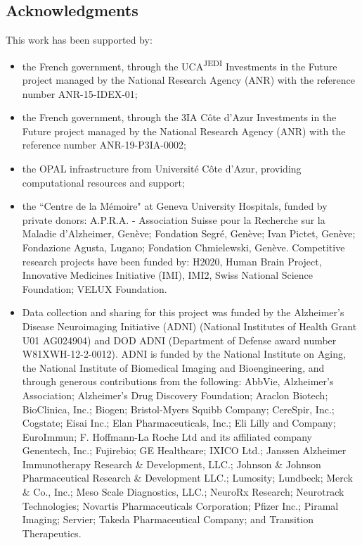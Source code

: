 \subsection*{Acknowledgments}
\label{sec:ack}

This work has been supported by:
\begin{itemize}
%
\item the French government, through the UCA\textsuperscript{JEDI} Investments in the Future project managed by the National Research Agency (ANR) with the reference number ANR-15-IDEX-01;
%
\item the French government, through the 3IA Côte d'Azur Investments in the Future project managed by the National Research Agency (ANR) with the reference number ANR-19-P3IA-0002;
%
\item the OPAL infrastructure from Université Côte d'Azur, providing computational resources and support;
%
\item the ``Centre de la Mémoire" at Geneva University Hospitals, funded by private donors:
A.P.R.A. - Association Suisse pour la Recherche sur la Maladie d’Alzheimer, Genève;
Fondation Segré, Genève;
Ivan Pictet, Genève;
Fondazione Agusta, Lugano;
Fondation Chmielewski, Genève.
Competitive research projects have been funded by: H2020, Human Brain Project, Innovative Medicines Initiative (IMI), IMI2, Swiss National Science Foundation;
VELUX Foundation.
%
\item Data collection and sharing for this project was funded by the Alzheimer's Disease Neuroimaging Initiative (ADNI) (National Institutes of Health Grant U01 AG024904) and DOD ADNI (Department of Defense award number W81XWH-12-2-0012).
ADNI is funded by the National Institute on Aging, the National Institute of Biomedical Imaging and Bioengineering, and through generous contributions from the following:
AbbVie, Alzheimer's Association; Alzheimer's Drug Discovery Foundation; Araclon Biotech; BioClinica, Inc.; Biogen; Bristol-Myers Squibb Company; CereSpir, Inc.; Cogstate; Eisai Inc.; Elan Pharmaceuticals, Inc.; Eli Lilly and Company; EuroImmun; F. Hoffmann-La Roche Ltd and its affiliated company Genentech, Inc.; Fujirebio; GE Healthcare; IXICO Ltd.; Janssen Alzheimer Immunotherapy Research \& Development, LLC.; Johnson \& Johnson Pharmaceutical Research \& Development LLC.; Lumosity; Lundbeck; Merck \& Co., Inc.; Meso Scale Diagnostics, LLC.; NeuroRx Research; Neurotrack Technologies; Novartis Pharmaceuticals Corporation; Pfizer Inc.; Piramal Imaging; Servier; Takeda Pharmaceutical Company; and Transition Therapeutics.

\end{itemize}
